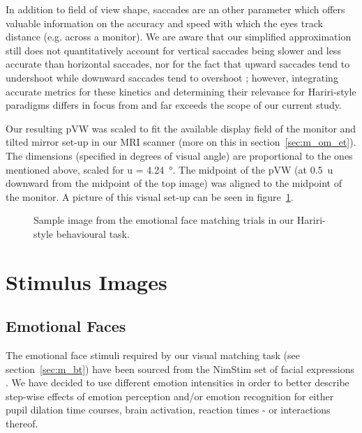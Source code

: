 	    In addition to field of view shape, saccades are an other parameter which offers valuable information on the accuracy and speed with which the eyes track distance (e.g. across a monitor).
	    We are aware that our simplified approximation still does not quantitatively account for vertical saccades being slower \citep{TerryBahill1975} and less accurate \citep{Collewijn1988} than horizontal saccades, 
	    nor for the fact that upward saccades tend to undershoot while downward saccades tend to overshoot \citep{Collewijn1988};
	    however, integrating accurate metrics for these kinetics and determining their relevance for Hariri-style paradigms differs in focus from and far exceeds the scope of our current study.
	    
	    Our resulting pVW was scaled to fit the available display field of the monitor and tilted mirror set-up in our MRI scanner (more on this in section~\ref{sec:m_om_et}).
	    The dimensions (specified in degrees of visual angle) are proportional to the ones mentioned above, scaled for u = \SI{4.24}{\degree}.
	    The midpoint of the pVW (at \SI{0.5}{u} downward from the midpoint of the top image) was aligned to the midpoint of the monitor.
	    A picture of this visual set-up can be seen in figure~\ref{fig:m_b_2}.
	    
	    \begin{figure}[!h]
		\caption{Sample image from the emotional face matching trials in our Hariri-style behavioural task.}
		\label{fig:m_b_2}
	    \end{figure}
			
    \section{Stimulus Images}
	\subsection{Emotional Faces}\label{sec:m_vs_ef}
	    The emotional face stimuli required by our visual matching task (see section~\ref{sec:m_bt}) have been sourced from the NimStim set of facial expressions \citep{Tottenham2009}.
	    We have decided to use different emotion intensities in order to better describe step-wise effects of emotion perception and/or emotion recognition for either pupil dilation time courses, brain activation, reaction times - or interactions thereof.
	    
